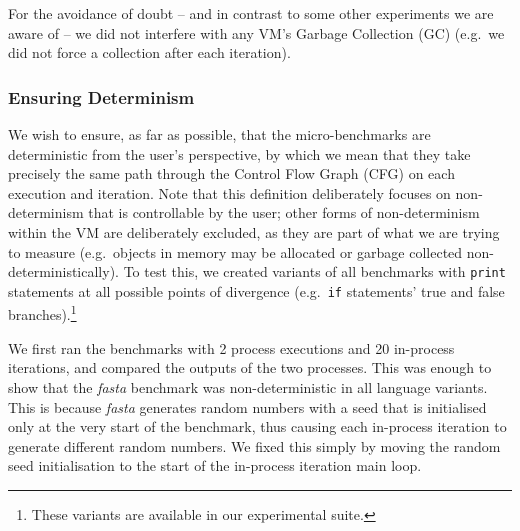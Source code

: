 \documentclass[a4paper,UKenglish]{lipics}
\newcommand{\fasta}{\emph{fasta}\xspace}
\begin{document}
For the avoidance of doubt -- and in
contrast to some other experiments we are aware of -- we
did not interfere with any VM's Garbage Collection (GC) (e.g.~we did not
force a collection after each iteration).


\subsubsection{Ensuring Determinism}

We wish to ensure, as far as possible, that the micro-benchmarks are
deterministic from the user's perspective, by which we mean that they
take precisely the same path through the Control Flow Graph (CFG) on each
execution and iteration. Note that this definition deliberately focuses
on non-determinism that is controllable by the user; other forms of
non-determinism within the VM are deliberately excluded, as they are
part of what we are trying to measure (e.g.~objects in memory may be allocated
or garbage collected non-deterministically). To test this, we created variants
of all benchmarks with \texttt{print} statements at all possible points of
divergence (e.g.~\texttt{if} statements' true and false branches).\footnote{These
variants are available in our experimental suite.}

We first ran the benchmarks with 2 process executions and 20 in-process iterations,
and compared the outputs of the two processes. This was enough to show that the
\fasta benchmark was non-deterministic
in all language variants. This is because \fasta generates random numbers with
a seed that is initialised only at the very start of the benchmark, thus
causing each in-process iteration to generate different random numbers. We
fixed this simply by moving the random seed initialisation to the start
of the in-process iteration main loop.
\end{document}
